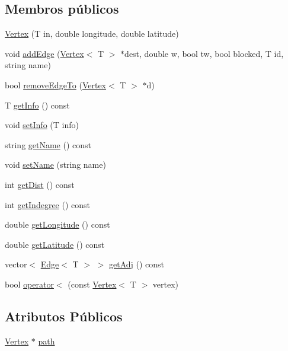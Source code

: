 \subsection*{Membros públicos}
\begin{DoxyCompactItemize}
\item 
\hyperlink{class_vertex_a32481367e36d2162714bc411f31b5f8f}{Vertex} (T in, double longitude, double latitude)
\item 
void \hyperlink{class_vertex_a40b147df89a89885a06fd9c3912c6dd5}{add\+Edge} (\hyperlink{class_vertex}{Vertex}$<$ T $>$ $\ast$dest, double w, bool tw, bool blocked, T id, string name)
\item 
bool \hyperlink{class_vertex_ab2b5b43fb1709a901b78718436763a84}{remove\+Edge\+To} (\hyperlink{class_vertex}{Vertex}$<$ T $>$ $\ast$d)
\item 
T \hyperlink{class_vertex_a5880b4b252ae6818819c2f9645784b59}{get\+Info} () const 
\item 
void \hyperlink{class_vertex_a31cd60c26640f8072a928ba70eb2f95e}{set\+Info} (T info)
\item 
string \hyperlink{class_vertex_a878c08e3eca2b53b173fa8c1fa77227d}{get\+Name} () const 
\item 
void \hyperlink{class_vertex_aee1d15f2efc9c7baecff72265beb1acf}{set\+Name} (string name)
\item 
int \hyperlink{class_vertex_a3379c6cbcf1eaacc098381e3557a0b52}{get\+Dist} () const 
\item 
int \hyperlink{class_vertex_a305ef01582f945f22134abb9294fe1f3}{get\+Indegree} () const 
\item 
double \hyperlink{class_vertex_aa88dbd3c9af86b1fd567a43c0da69017}{get\+Longitude} () const 
\item 
double \hyperlink{class_vertex_afbf6474fe17f4fd509bda1026fd81385}{get\+Latitude} () const 
\item 
vector$<$ \hyperlink{class_edge}{Edge}$<$ T $>$ $>$ \hyperlink{class_vertex_a4d8021f4861cc4195af3ecf042a015cc}{get\+Adj} () const 
\item 
bool \hyperlink{class_vertex_a7091b26f281a5041b1775a3d3f9cb7a6}{operator$<$} (const \hyperlink{class_vertex}{Vertex}$<$ T $>$ vertex)
\end{DoxyCompactItemize}
\subsection*{Atributos Públicos}
\begin{DoxyCompactItemize}
\item 
\hyperlink{class_vertex}{Vertex} $\ast$ \hyperlink{class_vertex_abd40febd917aa25add6bd42237c8463a}{path}
\end{DoxyCompactItemize}
